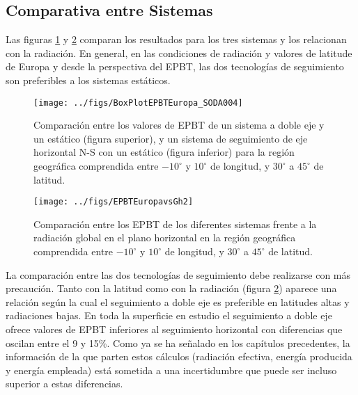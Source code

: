 \subsection{Comparativa entre Sistemas}


Las figuras \ref{EPBTComparaBoxPlot} y \ref{EPBTComparaGh} comparan
los resultados para los tres sistemas y los relacionan con la
radiación. En general, en las condiciones de radiación y valores de
latitude de Europa y desde la perspectiva del EPBT, las dos
tecnologías de seguimiento son preferibles a los sistemas estáticos.

\begin{figure}[p]
\begin{centering}
\texttt{[image: ../figs/BoxPlotEPBTEuropa\_SODA004]}
\par\end{centering}

\caption{\label{EPBTComparaBoxPlot}Comparación entre los valores de
  EPBT de un sistema a doble eje y un estático (figura superior), y un
  sistema de seguimiento de eje horizontal N-S con un estático (figura
  inferior) para la región geográfica comprendida entre $-10^{\circ}$
  y $10^{\circ}$ de longitud, y $30^{\circ}$ a $45^{\circ}$ de
  latitud.}
\end{figure}


\begin{figure}[p]
\begin{centering}
\texttt{[image: ../figs/EPBTEuropavsGh2]}
\par\end{centering}

\caption{\label{EPBTComparaGh}Comparación entre los EPBT de los
  diferentes sistemas frente a la radiación global en el plano
  horizontal en la región geográfica comprendida entre $-10^{\circ}$ y
  $10^{\circ}$ de longitud, y $30^{\circ}$ a $45^{\circ}$ de latitud.}
\end{figure}

La comparación entre las dos tecnologías de seguimiento debe
realizarse con más precaución. Tanto con la latitud como con la
radiación (figura \ref{EPBTComparaGh}) aparece una relación según la
cual el seguimiento a doble eje es preferible en latitudes altas y
radiaciones bajas. En toda la superficie en estudio el seguimiento a
doble eje ofrece valores de EPBT inferiores al seguimiento horizontal
con diferencias que oscilan entre el 9 y 15\%. Como ya se ha señalado
en los capítulos precedentes, la información de la que parten estos
cálculos (radiación efectiva, energía producida y energía empleada)
está sometida a una incertidumbre que puede ser incluso superior a
estas diferencias. 

